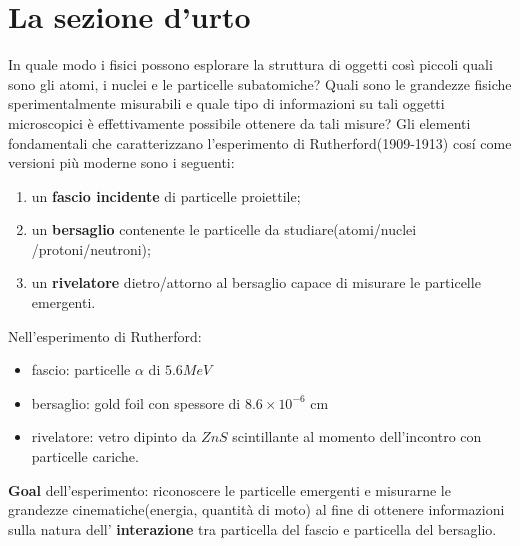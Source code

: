 \section{La sezione d'urto}\label{sec:sezione-d'urto}
In quale modo i fisici possono esplorare la struttura di oggetti così
piccoli quali sono gli atomi, i nuclei e le particelle subatomiche?
Quali sono le grandezze fisiche sperimentalmente misurabili e quale tipo
di informazioni su tali oggetti microscopici è effettivamente possibile
ottenere da tali misure?
Gli elementi fondamentali che caratterizzano l'esperimento di
Rutherford(1909-1913) cosí come versioni più moderne sono i seguenti:

\begin{enumerate}
	\item
	un \textbf{fascio incidente} di particelle proiettile;
	\item
	un \textbf{bersaglio} contenente le particelle da
	studiare(atomi/nuclei /protoni/neutroni);
	\item
	un \textbf{rivelatore} dietro/attorno al bersaglio capace di misurare
	le particelle emergenti.
\end{enumerate}

Nell'esperimento di Rutherford:

\begin{itemize}
	\tightlist
	\item
	fascio: particelle \(\alpha\) di \(5.6 MeV\)
	\item
	bersaglio: gold foil con spessore di \(8.6 \times 10^{-6}\) cm
	\item
	rivelatore: vetro dipinto da \(ZnS\) scintillante al momento
	dell'incontro con particelle cariche.
\end{itemize}

\textbf{Goal} dell'esperimento: riconoscere le particelle emergenti e
misurarne le grandezze cinematiche(energia, quantità di moto) al fine di
ottenere informazioni sulla natura dell' \textbf{interazione} tra
particella del fascio e particella del bersaglio.

